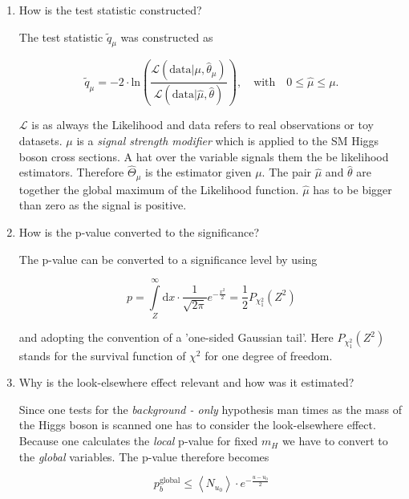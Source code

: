 \documentclass[10pt]{article}
\newenvironment{myfont}{\fontfamily{put}\selectfont}{\par}
\newcommand{\testStat}{\tilde{q}_{\mu}}
\begin{document}
\begin{myfont}
\begin{enumerate}[label = \textbf{\roman*}.]
  \item How is the test statistic constructed?

  \noindent The test statistic $\testStat$ was constructed as 
  
  \begin{equation}
      \testStat = -2 \cdot \textrm{ln} \left(\frac{\mathcal{L}\left(\textrm{data}|\mu, \hat{\theta}_{\mu}\right)}{\mathcal{L}\left(\textrm{data}|\hat{\mu}, \hat{\theta}\right)}\right), \quad \textrm{with} \quad 0 \leq \hat{\mu} \leq \mu.
  \end{equation}
	
	\noindent $\mathcal{L}$ is as always the Likelihood and data refers to real observations or toy datasets. 
	$\mu$ is a \textit{signal strength modifier} which is applied to the SM Higgs boson cross sections. 
	A hat over the variable signals them the be likelihood estimators. 
	Therefore $\hat{\Theta}_{\mu}$ is the estimator given $\mu$. 
	The pair $\hat{\mu}$ and $\hat{\theta}$ are together the global maximum of the Likelihood function. 
	$\hat{\mu}$ has to be bigger than zero as the signal is positive. 

  \item How is the p-value converted to the significance?

  \noindent The p-value can be converted to a significance level by using

  \begin{equation}
  	p = \int\limits_{Z}^{\infty} \textrm{d}x \cdot \frac{1}{\sqrt{2\pi}} e^{-\frac{x^{2}}{2}} = \frac{1}{2} P_{\chi^{2}_{1}}\left(Z^{2}\right)
  \end{equation}

  \noindent and adopting the convention of a 'one-sided Gaussian tail'.
  Here $P_{\chi^{2}_{1}}\left(Z^{2}\right)$ stands for the survival function of $\chi^{2}$ for one degree of freedom.

  \item Why is the look-elsewhere effect relevant and how was it estimated?

  \noindent \noindent Since one tests for the \textit{background - only} hypothesis man times as the mass of the Higgs boson is scanned one has to consider the look-elsewhere effect.
  Because one calculates the \textit{local} p-value for fixed $m_{H}$ we have to convert to the \textit{global} variables.
  The p-value therefore becomes

  \begin{equation}
  	p_{b}^{\textrm{global}} \leq \left<N_{u_{0}}\right> \cdot e^{-\frac{u - u_{0}}{2}}
  \end{equation}


\end{enumerate}
\end{myfont}
\end{document}
